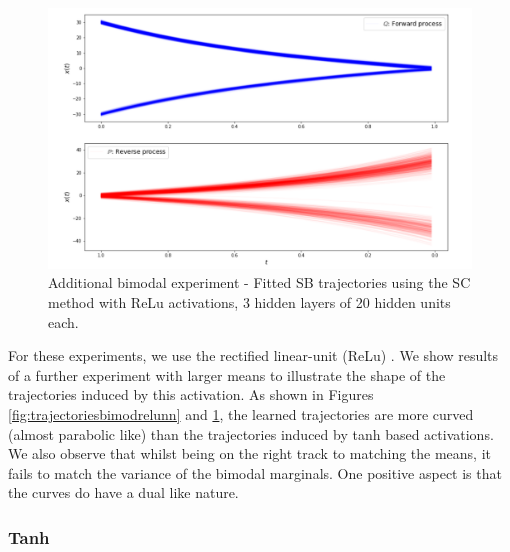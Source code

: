 \documentclass[a4paper,12pt,twoside,openright]{report}
\theoremstyle{definition}
\begin{document}
\begin{figure}
    \centering
    \includegraphics[scale=0.7,trim={0cm 0cm 0cm 0}, clip]{images/Control/almost_perfect_bimodal_relu.PNG}
    \caption{ Additional bimodal experiment - Fitted SB  trajectories using the SC method with ReLu activations, 3 hidden layers of 20 hidden units each.}
    \label{fig:trajectoriesbimodrelunn_}
\end{figure}

For these experiments, we use the rectified linear-unit (ReLu) \citep{glorot2011deep}. We show results of a further experiment with larger means to illustrate the shape of the trajectories induced by this activation. As shown in Figures \ref{fig:trajectoriesbimodrelunn} and \ref{fig:trajectoriesbimodrelunn_}, the learned trajectories are more curved (almost parabolic like) than the trajectories induced by tanh based activations. We also observe  that whilst being on the right track to matching the means, it fails to match the variance of the bimodal marginals. One positive aspect is that the curves do have a dual like nature.

\subsubsection{Tanh}
\end{document}
